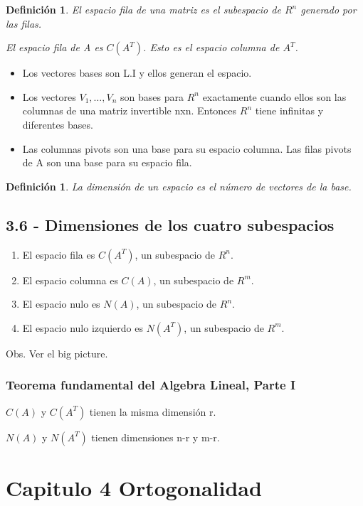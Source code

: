 \documentclass[]{article}
\newtheorem{definicion}[def1]{Definición}
\begin{document}
\begin{definicion}
	El espacio fila de una matriz es el subespacio de $R^n$ generado por las filas.
	
	El espacio fila de A es $C(A^T)$. Esto es el espacio columna de $A^T$.
\end{definicion}

\begin{itemize}
	\item Los vectores bases son L.I y ellos generan el espacio.
	\item Los vectores $V_1,\ldots,V_n$ son bases para $R^n$ exactamente cuando ellos son las columnas de una matriz invertible nxn. Entonces $R^n$ tiene infinitas y diferentes bases.
	\item Las columnas pivots son una base para su espacio columna. Las filas pivots de A son una base para su espacio fila.
\end{itemize}
\begin{definicion}
	La dimensi\'on de un espacio es el n\'umero de vectores de la base.
\end{definicion}

\subsection{3.6 - Dimensiones de los cuatro subespacios}
\begin{enumerate}
	\item El espacio fila es $C(A^T)$, un subespacio de $R^n$.
	\item El espacio columna es $C(A)$, un subespacio de $R^m$.
	\item El espacio nulo es $N(A)$, un subespacio de $R^n$.
	\item El espacio nulo izquierdo es $N(A^T)$, un subespacio de $R^m$.
\end{enumerate}
Obs. Ver el big picture.

\subsubsection{Teorema fundamental del Algebra Lineal, Parte I}
$C(A)$ y $C(A^T)$ tienen la misma dimensi\'on r.

$N(A)$ y $N(A^T)$ tienen dimensiones n-r y m-r.

\section{Capitulo 4 Ortogonalidad}
\end{document}
